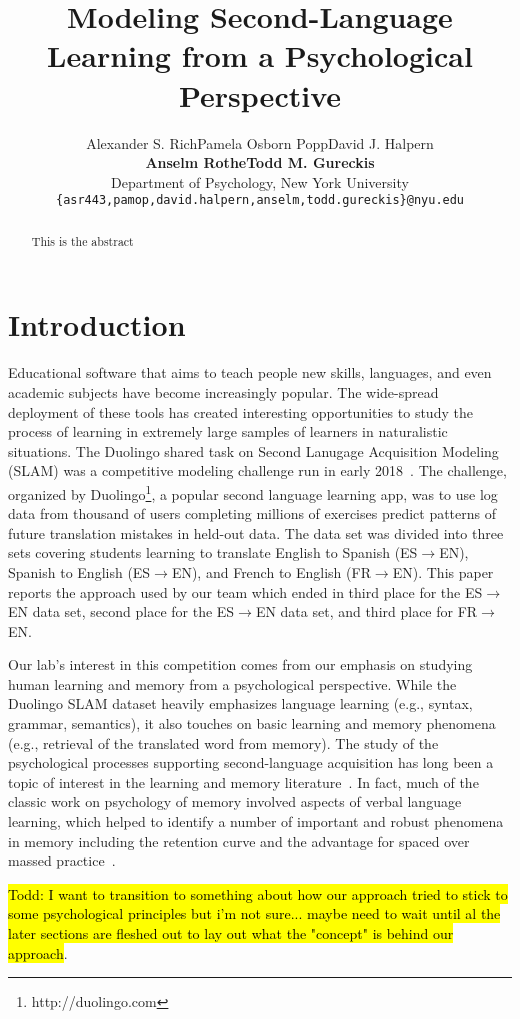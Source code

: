 \documentclass[11pt,a4paper]{article}
\title{Modeling Second-Language Learning from a Psychological Perspective}
\author{Alexander S. Rich\qquad Pamela Osborn Popp\qquad David J. Halpern\\
  \textbf{Anselm Rothe\qquad Todd M. Gureckis} \\
  Department of Psychology, New York University \\
  {\tt \{asr443,pamop,david.halpern,anselm,todd.gureckis\}@nyu.edu} \\}
\date{}
\begin{document}
\maketitle
\begin{abstract}
This is the abstract
\end{abstract}

\section{Introduction}

Educational software that aims to teach people new skills, languages, and
even academic subjects have become increasingly popular.  The wide-spread
deployment of these tools has created interesting opportunities to study
the process of learning in extremely large samples of learners in naturalistic
situations. The Duolingo shared task on Second Lanugage Acquisition Modeling (SLAM)
was a competitive modeling challenge run in early 2018~\cite{slam18}.
The challenge, organized by Duolingo\footnote{http://duolingo.com}, a popular second
language learning app, was
to use log data from thousand of users completing millions of exercises 
predict patterns of future translation mistakes in held-out data.  The data set was
divided into three sets covering students learning to translate English to Spanish (ES$\to$EN),
Spanish to English (ES$\to$EN), and French to English (FR$\to$EN).
This paper reports the approach used by our team which ended in third place 
for the ES$\to$EN data set, second place for the ES$\to$EN data set, and third place
for FR$\to$EN.

Our lab's interest in this competition comes from our emphasis on studying human learning
and memory from a psychological perspective.  While the Duolingo SLAM dataset 
heavily emphasizes language learning (e.g., syntax, grammar, semantics), it also touches on
basic learning and memory phenomena (e.g., retrieval of the translated
word from memory).  The study of the psychological processes supporting second-language 
acquisition has long been a topic of interest in the learning and memory literature~\cite[e.g.,]{Atkinson:1972rm,Atkinson:1972rz,Pavlik:2008rm}.
In fact, much of the classic work on psychology of memory involved aspects of verbal
language learning, which helped to identify a number of important and robust phenomena
in memory including the retention curve and the advantage for spaced
over massed practice~\cite{Ruth:1928aa,Rubin:1996aa,Cepeda:2006aa}.

\hl{ Todd: I want to transition to something about how our approach tried to stick to some
psychological principles but i'm not sure... maybe need to wait until al the later sections
are fleshed out to lay out what the "concept" is behind our approach}.
\end{document}
